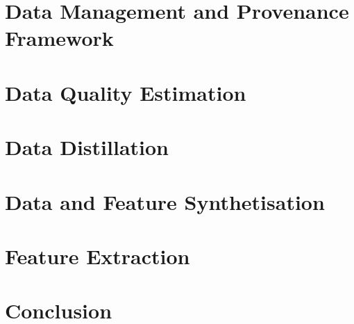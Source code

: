 \documentclass{manolo}
\begin{document}
\clearpage
\section{Data Management and Provenance Framework}
\label{sec:datmgmt}


\clearpage
\section{Data Quality Estimation}
\label{sec:datqual}


\clearpage
\section{Data Distillation}
\label{sec:datdist}


\clearpage
\section{Data and Feature Synthetisation}
\label{sec:datsynth}


\clearpage
\section{Feature Extraction}
\label{sec:featextr}


\clearpage
\section{Conclusion}
\end{document}
